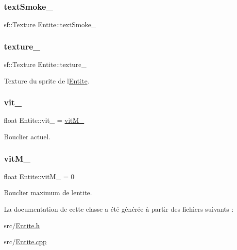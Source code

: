 \mbox{\label{class_entite_ae462844a9f175f3abcf6d91412fb2f21}} 
\subsubsection{\texorpdfstring{text\+Smoke\+\_\+}{textSmoke\_}}
{\footnotesize\ttfamily sf\+::\+Texture Entite\+::text\+Smoke\+\_\+\hspace{0.3cm}{\ttfamily [protected]}}

\mbox{\label{class_entite_a8147b9459318a9b1de1b72dce115680a}} 
\subsubsection{\texorpdfstring{texture\+\_\+}{texture\_}}
{\footnotesize\ttfamily sf\+::\+Texture Entite\+::texture\+\_\+\hspace{0.3cm}{\ttfamily [protected]}}



Texture du sprite de l\textquotesingle{}\hyperlink{class_entite}{Entite}. 

\mbox{\label{class_entite_aaacb36948d7853e03a7f9a42aa6ad2d5}} 
\subsubsection{\texorpdfstring{vit\+\_\+}{vit\_}}
{\footnotesize\ttfamily float Entite\+::vit\+\_\+ = \hyperlink{class_entite_ac5f9e68aa96316c6871e1980766977a9}{vit\+M\+\_\+}\hspace{0.3cm}{\ttfamily [protected]}}



Bouclier actuel. 

\mbox{\label{class_entite_ac5f9e68aa96316c6871e1980766977a9}} 
\subsubsection{\texorpdfstring{vit\+M\+\_\+}{vitM\_}}
{\footnotesize\ttfamily float Entite\+::vit\+M\+\_\+ = 0\hspace{0.3cm}{\ttfamily [protected]}}



Bouclier maximum de l\textquotesingle{}entite. 



La documentation de cette classe a été générée à partir des fichiers suivants \+:\begin{DoxyCompactItemize}
\item 
src/\hyperlink{_entite_8h}{Entite.\+h}\item 
src/\hyperlink{_entite_8cpp}{Entite.\+cpp}\end{DoxyCompactItemize}
